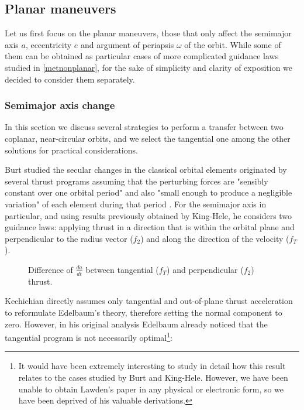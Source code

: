 \subsection{Planar maneuvers} \label{metplanar}

Let us first focus on the planar maneuvers, those that only affect the semimajor axis $a$, eccentricity $e$ and argument of periapsis $\omega$ of the orbit. While some of them can be obtained as particular cases of more complicated guidance laws studied in \ref{metnonplanar}, for the sake of simplicity and clarity of exposition we decided to consider them separately.

\subsubsection{Semimajor axis change} \label{metsma}

In this section we discuss several strategies to perform a transfer between two coplanar, near-circular orbits, and we select the tangential one among the other solutions for practical considerations.

Burt studied the secular changes in the classical orbital elements originated by several thrust programs assuming that the perturbing forces are "sensibly constant over one orbital period" and also "small enough to produce a negligible variation" of each element during that period \cite{burt1967space}. For the semimajor axis in particular, and using results previously obtained by King-Hele, he considers two guidance laws: applying thrust in a direction that is within the orbital plane and perpendicular to the radius vector ($f_2$)  and along the direction of the velocity ($f_T$).

\begin{figure}%
  \centering
  \resizebox{1.0\textwidth}{!}
  {
  
  }
  \caption{Difference of $\frac{da}{dt}$ between tangential ($f_T$) and perpendicular ($f_2$) thrust.}
  \label{fig:burtdiff}
\end{figure}

Kechichian directly assumes only tangential and out-of-plane thrust acceleration to reformulate Edelbaum's theory, therefore setting the normal component to zero. However, in his original analysis Edelbaum already noticed that the tangential program is not necessarily optimal\footnote{It would have been extremely interesting to study in detail how this result relates to the cases studied by Burt and King-Hele. However, we have been unable to obtain Lawden's paper in any physical or electronic form, so we have been deprived of his valuable derivations.}:

